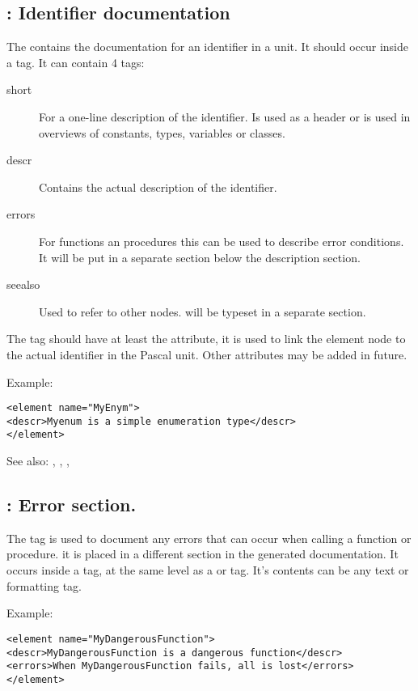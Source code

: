 \subsection{ : Identifier documentation}
\label{tag:element}
The  contains the documentation for an identifier in a unit. It
should occur inside a  tag. It can contain 4 tags:
\begin{description}
\item[short] For a one-line description of the identifier. Is used as a
header or is used in overviews of constants, types, variables or classes.
\item[descr] Contains the actual description of the identifier.
\item[errors] For functions an procedures this can be used to describe error
conditions. It will be put in a separate section below the description
section.
\item[seealso] Used to refer to other nodes. will be typeset in a separate
section.
\end{description}

The  tag should have at least the  attribute, it 
is used to link the element node to the actual identifier in the Pascal unit.
Other attributes may be added in future.

Example:
\begin{verbatim}
<element name="MyEnym">
<descr>Myenum is a simple enumeration type</descr>
</element>
\end{verbatim}

See also: , , , 

\subsection{ : Error section.}
\label{tag:errors}
The  tag is used to document any errors that can occur when
calling a function or procedure. it is placed in a different section in the
generated documentation. It occurs inside a  tag, at the same
level as a  or  tag. It's contents can be any
text or formatting tag.

Example:
\begin{verbatim}
<element name="MyDangerousFunction">
<descr>MyDangerousFunction is a dangerous function</descr>
<errors>When MyDangerousFunction fails, all is lost</errors>
</element>
\end{verbatim}

